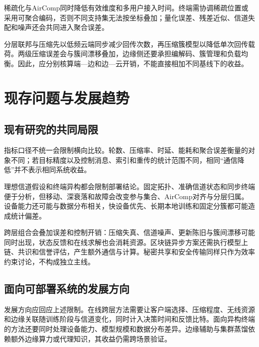 稀疏化与AirComp同时降低有效维度和多用户接入时间。终端需协调稀疏位置或采用可聚合编码，否则不同支持集无法按坐标叠加；量化误差、残差近似、信道失配和噪声还会共同进入聚合误差\cite{Oh2024SparseOneBitOTA}。

分层联邦与压缩先以低频云端同步减少回传次数，再压缩簇模型以降低单次回传载荷。两级压缩误差会与簇间漂移叠加，边缘侧还要承担编解码、簇管理和负载均衡\cite{Liu2023HierarchicalQuantization,Chen2025EdgeAssistedSparsification}。因此，应分别核算端—边和边—云开销，不能直接相加不同基线下的收益。

\section{现存问题与发展趋势}\label{sec:challenges}

\subsection{现有研究的共同局限}\label{subsec:common-limitations}

指标口径不统一会限制横向比较。轮数、压缩率、时延、能耗和聚合误差衡量的对象不同；若目标精度以及控制消息、索引和重传的统计范围不同，相同“通信降低”并不表示相同系统收益\cite{Lim2020MobileEdge,Mills2020WirelessEdgeIoT,Ge2025EfficientFLSurvey}。

理想信道假设和终端异构都会限制部署结论。固定拓扑、准确信道状态和同步终端便于分析，但移动、深衰落和故障会改变参与集合、AirComp对齐与分层归属\cite{Tegin2023TimeVaryingOTA,Azimi2024HierarchicalOTA}。设备能力还可能与数据分布相关，快设备优先、长期本地训练和固定分簇都可能造成统计偏差。

跨层组合会叠加误差和控制开销：压缩失真、信道噪声、更新陈旧与簇间漂移可能同时出现，状态反馈和在线求解也会消耗资源。区块链异步方案还需执行模型上链、共识和信誉评估，产生额外通信与计算\cite{Huang2024BlockchainAFL}。秘密共享和安全传输同样只作为效率约束讨论，不构成独立主线\cite{Chen2022SecureCompressedFL,Meng2025UAVEnergy}。

\subsection{面向可部署系统的发展方向}\label{subsec:future-directions}

发展方向应回应上述限制。在线跨层方法需要让客户端选择、压缩程度、无线资源和边缘关联随训练阶段与信道变化，同时计入决策时间和反馈比特\cite{Xu2021ClientBandwidth,Marnissi2024AdaptiveSQ,Azimi2024HierarchicalOTA}。面向异构终端的方法还要同时处理设备能力、模型规模和数据分布差异。边缘辅助与集群蒸馏依赖额外边缘算力或代理知识，其收益仍需跨场景验证\cite{Zhong2022HierarchicalHeterogeneous,Chen2025EdgeAssistedSparsification,Zhang2026FedCD}。

